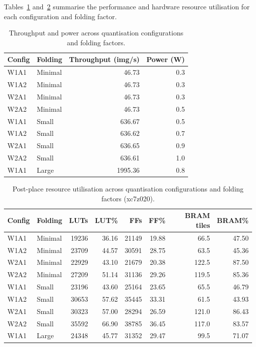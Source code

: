 \documentclass[11pt]{article}
\begin{document}
Tables~\ref{tab:exp3_results} and~\ref{tab:exp3_util} summarise the performance and hardware resource utilisation for each configuration and folding factor.

\begin{table}[H]
\centering
\caption{Throughput and power across quantisation configurations and folding factors.}
\label{tab:exp3_results}
\begin{tabular}{llrr}
\hline
\textbf{Config} & \textbf{Folding} & \textbf{Throughput (img/s)} & \textbf{Power (W)} \\
\hline
W1A1 & Minimal &   46.73 & 0.3 \\
W1A2 & Minimal &   46.73 & 0.3 \\
W2A1 & Minimal &   46.73 & 0.3 \\
W2A2 & Minimal &   46.73 & 0.5 \\
\hline
W1A1 & Small   &  636.67 & 0.5 \\
W1A2 & Small   &  636.62 & 0.7 \\
W2A1 & Small   &  636.65 & 0.9 \\
W2A2 & Small   &  636.61 & 1.0 \\
\hline
W1A1 & Large   & 1995.36 & 0.8 \\
\hline
\end{tabular}
\end{table}

\begin{table}[H]
\centering
\caption{Post-place resource utilisation across quantisation configurations and folding factors (xc7z020).}
\label{tab:exp3_util}
\begin{tabular}{llrrrrrr}
\hline
\textbf{Config} & \textbf{Folding} & \textbf{LUTs} & \textbf{LUT\%} & \textbf{FFs} & \textbf{FF\%} & \textbf{BRAM tiles} & \textbf{BRAM\%} \\
\hline
W1A1 & Minimal & 19236 & 36.16 & 21149 & 19.88 &  66.5 & 47.50 \\
W1A2 & Minimal & 23709 & 44.57 & 30591 & 28.75 &  63.5 & 45.36 \\
W2A1 & Minimal & 22929 & 43.10 & 21679 & 20.38 & 122.5 & 87.50 \\
W2A2 & Minimal & 27209 & 51.14 & 31136 & 29.26 & 119.5 & 85.36 \\
\hline
W1A1 & Small   & 23196 & 43.60 & 25164 & 23.65 &  65.5 & 46.79 \\
W1A2 & Small   & 30653 & 57.62 & 35445 & 33.31 &  61.5 & 43.93 \\
W2A1 & Small   & 30323 & 57.00 & 28294 & 26.59 & 121.0 & 86.43 \\
W2A2 & Small   & 35592 & 66.90 & 38785 & 36.45 & 117.0 & 83.57 \\
\hline
W1A1 & Large   & 24348 & 45.77 & 31352 & 29.47 &  99.5 & 71.07 \\
\hline
\end{tabular}
\end{table}
\end{document}
